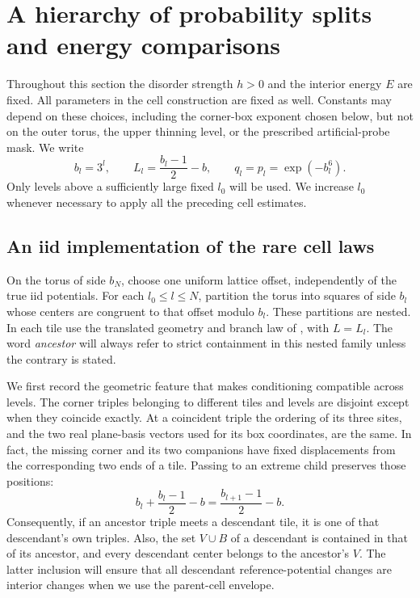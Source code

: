 \section{A hierarchy of probability splits and energy comparisons}
\label{sec:hierarchy}

Throughout this section the disorder strength $h>0$ and the interior energy
$E$ are fixed.  All parameters in the cell construction are fixed as well.
Constants may depend on these choices, including the corner-box exponent
chosen below, but not on the outer torus, the upper thinning level, or the
prescribed artificial-probe mask.  We write
\[
 b_l=3^l,\qquad L_l=\frac{b_l-1}{2}-b,
 \qquad q_l=p_l=\exp(-b_l^6).
\]
Only levels above a sufficiently large fixed $l_0$ will be used.  We increase
$l_0$ whenever necessary to apply all the preceding cell estimates.

\subsection{An iid implementation of the rare cell laws}

On the torus of side $b_N$, choose one uniform lattice offset, independently
of the true iid potentials.  For each $l_0\le l\le N$, partition the torus
into squares of side $b_l$ whose centers are congruent to that offset modulo
$b_l$.  These partitions are nested.  In each tile use the translated
geometry and branch law of , with
$L=L_l$.  The word \emph{ancestor} will always refer to strict containment
in this nested family unless the contrary is stated.

We first record the geometric feature that makes conditioning compatible
across levels.  The corner triples belonging to different tiles and levels
are disjoint except when they coincide exactly.  At a coincident triple
the ordering of its three sites, and the two real plane-basis vectors used
for its box coordinates, are the same.  In fact, the missing corner and
its two companions have fixed displacements from the corresponding two
ends of a tile.  Passing to an extreme child preserves those positions:
\[
 b_l+\frac{b_l-1}{2}-b
       =\frac{b_{l+1}-1}{2}-b.
\]
Consequently, if an ancestor triple meets a descendant tile, it is one of
that descendant's own triples.  Also, the set $V\cup B$ of a descendant
is contained in that of its ancestor, and every descendant center belongs
to the ancestor's $V$.  The latter inclusion will ensure that all
descendant reference-potential changes are interior changes when we use
the parent-cell envelope.

